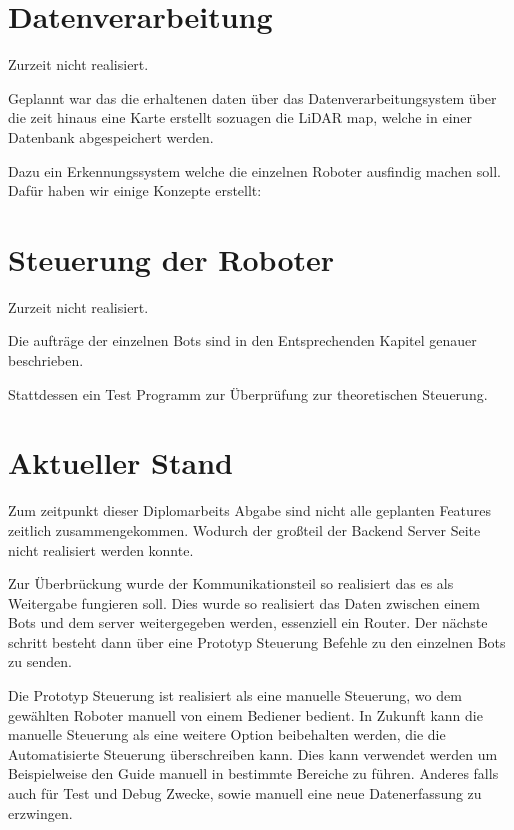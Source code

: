\section{Datenverarbeitung}
Zurzeit nicht realisiert.

Geplannt war das die erhaltenen daten über das Datenverarbeitungsystem 
über die zeit hinaus eine Karte erstellt sozuagen die LiDAR map,
welche in einer Datenbank abgespeichert werden.

Dazu ein Erkennungssystem welche die einzelnen Roboter ausfindig machen soll.
Dafür haben wir einige Konzepte erstellt:

\section{Steuerung der Roboter}
\label{subsec:backend_robot_detection}
Zurzeit nicht realisiert.

Die aufträge der einzelnen Bots sind in den Entsprechenden Kapitel genauer beschrieben.

Stattdessen ein Test Programm zur Überprüfung zur theoretischen Steuerung.

\section{Aktueller Stand}
Zum zeitpunkt dieser Diplomarbeits Abgabe sind nicht alle geplanten Features zeitlich zusammengekommen.
Wodurch der großteil der Backend Server Seite nicht realisiert werden konnte.

Zur Überbrückung wurde der Kommunikationsteil so realisiert das es als Weitergabe fungieren soll.
Dies wurde so realisiert das Daten zwischen einem Bots und dem server weitergegeben werden, 
essenziell ein Router. 
Der nächste schritt besteht dann über eine Prototyp Steuerung 
Befehle zu den einzelnen Bots zu senden.

Die Prototyp Steuerung ist realisiert als eine manuelle Steuerung, 
wo dem gewählten Roboter manuell von einem Bediener bedient.
In Zukunft kann die manuelle Steuerung als eine weitere Option beibehalten werden, 
die die Automatisierte Steuerung überschreiben kann. 
Dies kann verwendet werden um Beispielweise den Guide manuell in bestimmte Bereiche zu führen.
Anderes falls auch für Test und Debug Zwecke, sowie manuell eine neue Datenerfassung zu erzwingen.

